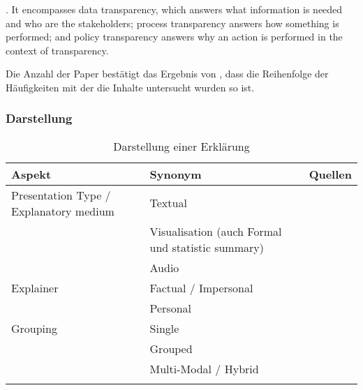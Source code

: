 . It encompasses data transparency, which answers what information is needed and who are the stakeholders; process transparency answers how something is performed; and policy transparency answers why an action is performed in the context of transparency. \cite{chazette2020explainability}

Die Anzahl der Paper bestätigt das Ergebnis von \cite{chazette_end-users_nodate}, dass die Reihenfolge der Häufigkeiten mit der die Inhalte untersucht wurden so ist.

\subsubsection{Darstellung}

\begin{longtable}{|p{}|p{}|p{}|}
    \hline
    \textbf{Aspekt}     & \textbf{Synonym} & \textbf{Quellen} \\ \hline
    Presentation Type / Explanatory medium
                        & Textual  & \cite{sokol_explainability_2020} \cite{balog_measuring_2020} \cite{tintarev_designing_nodate} \cite{sato_action-triggering_2019} \cite{eiband_impact_2019} \cite{eiband_impact_2019} \cite{abdulrahman_belief-based_2019} \cite{cassens_ambient_2019} \cite{nunes_systematic_2017} \\
                        & Visualisation (auch Formal und statistic summary) & \cite{sokol_explainability_2020} \cite{sato_action-triggering_2019} \cite{sokol_explainability_2020}  \cite{mucha_interfaces_2021} \cite{abdulrahman_belief-based_2019} \cite{nunes_systematic_2017} \cite{schrills_color_2020} \\
                       
                        & Audio & \cite{wiegand2019drive} \cite{nunes_systematic_2017} \cite{wang_is_2018} \\
    \hline
    Explainer           & Factual / Impersonal & \cite{eiband_impact_2019} \cite{abdulrahman_belief-based_2019} \cite{kunkel_let_2019} \cite{neerincx_using_2018} \\
                        & Personal & \cite{abdulrahman_belief-based_2019} \cite{kunkel_let_2019} \cite{weitz_you_2019} \cite{zahedi_towards_2019} \cite{neerincx_using_2018} \\
    \hline
    Grouping            & Single & \cite{nunes_systematic_2017} \cite{balog_measuring_2020} \cite{sato_action-triggering_2019} \cite{eiband_impact_2019} \cite{abdulrahman_belief-based_2019} \\
                        & Grouped & \cite{nunes_systematic_2017} \cite{balog_measuring_2020} \cite{tintarev_designing_nodate}  \\
                        & Multi-Modal / Hybrid & \cite{sato_action-triggering_2019} \cite{abdulrahman_belief-based_2019} \cite{cassens_ambient_2019} \\
    \hline
\caption{Darstellung einer Erklärung}
\label{tab:presentation_of_explanations}
\end{longtable}


\smallskip

\noindent{}

\smallskip